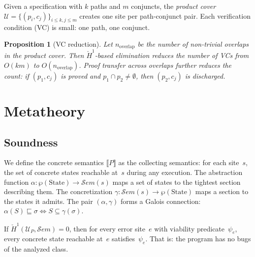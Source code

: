 \documentclass[acmsmall,screen]{acmart}
\newtheorem{proposition}{Proposition}
\theoremstyle{remark}
\newcommand{\Sem}{\mathcal{S}\mathit{em}}
\newcommand{\Hc}[1]{\check{H}^{#1}}
\begin{document}
Given a specification with $k$ paths and $m$ conjuncts, the
\emph{product cover} $\mathcal{U} = \{(p_i, c_j)\}_{i \leq k, j \leq m}$
creates one site per path-conjunct pair.  Each verification condition
(VC) is small: one path, one conjunct.

\begin{proposition}[VC reduction]\label{prop:vc-reduction}
Let $n_{\mathrm{overlap}}$ be the number of non-trivial overlaps in
the product cover.  Then $\Hc{1}$-based elimination reduces the
number of VCs from $O(km)$ to $O(n_{\mathrm{overlap}})$.
Proof transfer across overlaps further reduces the count:
if $(p_1, c_j)$ is proved and $p_1 \cap p_2 \neq \emptyset$,
then $(p_2, c_j)$ is discharged.
\end{proposition}

\section{Metatheory}\label{sec:metatheory}

\subsection{Soundness}\label{sec:soundness}

We define the concrete semantics $\llbracket P \rrbracket$ as the
collecting semantics: for each site~$s$, the set of concrete states
reachable at~$s$ during any execution.  The abstraction function
$\alpha : \wp(\mathrm{State}) \to \Sem(s)$ maps a set of states to
the tightest section describing them.  The concretization
$\gamma : \Sem(s) \to \wp(\mathrm{State})$ maps a section to the
states it admits.  The pair $(\alpha, \gamma)$ forms a Galois
connection: $\alpha(S) \sqsubseteq \sigma \iff S \subseteq \gamma(\sigma)$.

\begin{theorem}[Soundness]\label{thm:soundness}
If $\Hc{1}(\mathcal{U}_P, \Sem) = 0$, then for every error site~$e$
with viability predicate~$\psi_e$, every concrete state reachable
at~$e$ satisfies~$\psi_e$.  That is: the program has no bugs of the
analyzed class.
\end{theorem}
\end{document}
